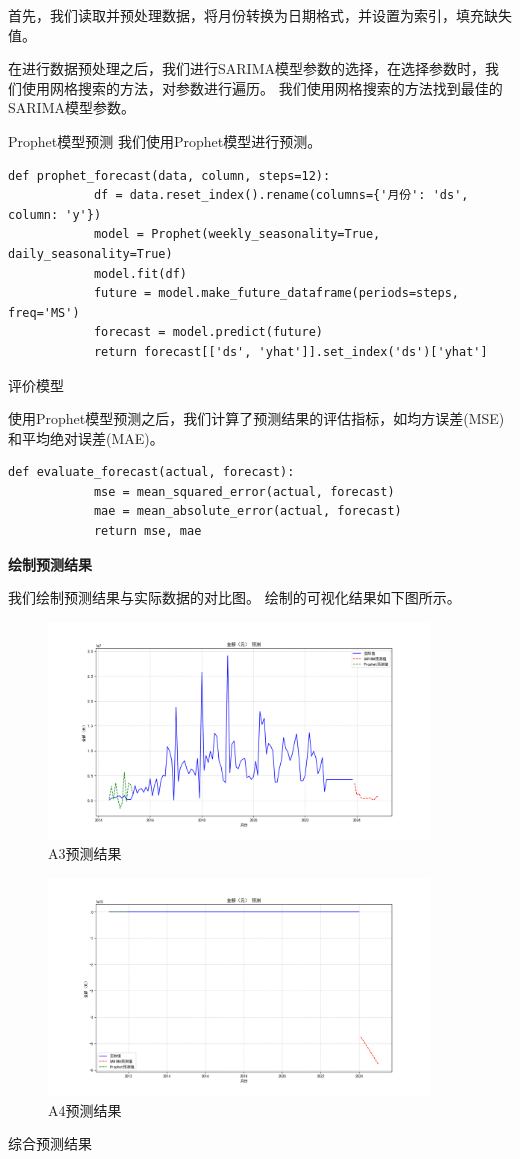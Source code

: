 \documentclass[a4paper]{article}
\begin{document}
	首先，我们读取并预处理数据，将月份转换为日期格式，并设置为索引，填充缺失值。

	在进行数据预处理之后，我们进行SARIMA模型参数的选择，在选择参数时，我们使用网格搜索的方法，对参数进行遍历。
	我们使用网格搜索的方法找到最佳的SARIMA模型参数。

	Prophet模型预测
	我们使用Prophet模型进行预测。
	\begin{lstlisting}[caption={Python Example}, label={lst:example}]
		def prophet_forecast(data, column, steps=12):
			df = data.reset_index().rename(columns={'月份': 'ds', column: 'y'})
			model = Prophet(weekly_seasonality=True, daily_seasonality=True)
			model.fit(df)
			future = model.make_future_dataframe(periods=steps, freq='MS')
			forecast = model.predict(future)
			return forecast[['ds', 'yhat']].set_index('ds')['yhat']
	\end{lstlisting}
	评价模型

	使用Prophet模型预测之后，我们计算了预测结果的评估指标，如均方误差(MSE)和平均绝对误差(MAE)。
	\begin{lstlisting}[caption={Python Example}, label={lst:example}]
		def evaluate_forecast(actual, forecast):
			mse = mean_squared_error(actual, forecast)
			mae = mean_absolute_error(actual, forecast)
			return mse, mae

	\end{lstlisting}

	\textbf{绘制预测结果}

	我们绘制预测结果与实际数据的对比图。
	绘制的可视化结果如下图所示。
	\begin{figure}[H]
		\centering
		\includegraphics[width=0.9\textwidth]{img/Second_1.png}
		\caption{A3预测结果}
	\end{figure}
	\begin{figure}[H]
		\centering
		\includegraphics[width=0.9\textwidth]{img/Second_2.png}
		\caption{A4预测结果}
	\end{figure}
	综合预测结果
\end{document}
